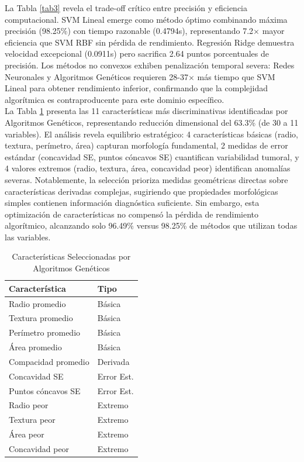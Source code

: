 \documentclass[conference]{IEEEtran}
\begin{document}
La Tabla \ref{tab3} revela el trade-off crítico entre precisión y eficiencia computacional. SVM Lineal emerge como método óptimo combinando máxima precisión (98.25\%) con tiempo razonable (0.4794s), representando 7.2$\times$ mayor eficiencia que SVM RBF sin pérdida de rendimiento. Regresión Ridge demuestra velocidad excepcional (0.0911s) pero sacrifica 2.64 puntos porcentuales de precisión. Los métodos no convexos exhiben penalización temporal severa: Redes Neuronales y Algoritmos Genéticos requieren 28-37$\times$ más tiempo que SVM Lineal para obtener rendimiento inferior, confirmando que la complejidad algorítmica es contraproducente para este dominio específico.\\

La Tabla \ref{tab4} presenta las 11 características más discriminativas identificadas por Algoritmos Genéticos, representando reducción dimensional del 63.3\% (de 30 a 11 variables). El análisis revela equilibrio estratégico: 4 características básicas (radio, textura, perímetro, área) capturan morfología fundamental, 2 medidas de error estándar (concavidad SE, puntos cóncavos SE) cuantifican variabilidad tumoral, y 4 valores extremos (radio, textura, área, concavidad peor) identifican anomalías severas. Notablemente, la selección prioriza medidas geométricas directas sobre características derivadas complejas, sugiriendo que propiedades morfológicas simples contienen información diagnóstica suficiente. Sin embargo, esta optimización de características no compensó la pérdida de rendimiento algorítmico, alcanzando solo 96.49\% versus 98.25\% de métodos que utilizan todas las variables.

\begin{table}[htbp]
\caption{Características Seleccionadas por Algoritmos Genéticos}
\begin{center}
\footnotesize
\begin{tabular}{|l|l|}
\hline
\textbf{Característica} & \textbf{Tipo} \\
\hline
Radio promedio & Básica \\
\hline
Textura promedio & Básica \\
\hline
Perímetro promedio & Básica \\
\hline
Área promedio & Básica \\
\hline
Compacidad promedio & Derivada \\
\hline
Concavidad SE & Error Est. \\
\hline
Puntos cóncavos SE & Error Est. \\
\hline
Radio peor & Extremo \\
\hline
Textura peor & Extremo \\
\hline
Área peor & Extremo \\
\hline
Concavidad peor & Extremo \\
\hline
\end{tabular}
\label{tab4}
\end{center}
\end{table}
\end{document}
